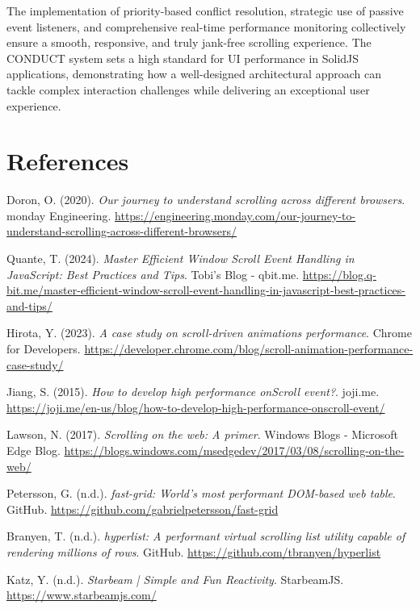 \documentclass[10pt]{article}
\begin{document}
The implementation of priority-based conflict resolution, strategic use of passive event listeners, and comprehensive real-time performance monitoring collectively ensure a smooth, responsive, and truly jank-free scrolling experience. The CONDUCT system sets a high standard for UI performance in SolidJS applications, demonstrating how a well-designed architectural approach can tackle complex interaction challenges while delivering an exceptional user experience.

\section{References}
\begin{thebibliography}{99}

 Doron, O. (2020). \textit{Our journey to understand scrolling across different browsers}. monday Engineering. \url{https://engineering.monday.com/our-journey-to-understand-scrolling-across-different-browsers/}

 Quante, T. (2024). \textit{Master Efficient Window Scroll Event Handling in JavaScript: Best Practices and Tips}. Tobi's Blog - qbit.me. \url{https://blog.q-bit.me/master-efficient-window-scroll-event-handling-in-javascript-best-practices-and-tips/}

 Hirota, Y. (2023). \textit{A case study on scroll-driven animations performance}. Chrome for Developers. \url{https://developer.chrome.com/blog/scroll-animation-performance-case-study/}

 Jiang, S. (2015). \textit{How to develop high performance onScroll event?}. joji.me. \url{https://joji.me/en-us/blog/how-to-develop-high-performance-onscroll-event/}

 Lawson, N. (2017). \textit{Scrolling on the web: A primer}. Windows Blogs - Microsoft Edge Blog. \url{https://blogs.windows.com/msedgedev/2017/03/08/scrolling-on-the-web/}

 Petersson, G. (n.d.). \textit{fast-grid: World's most performant DOM-based web table}. GitHub. \url{https://github.com/gabrielpetersson/fast-grid}

 Branyen, T. (n.d.). \textit{hyperlist: A performant virtual scrolling list utility capable of rendering millions of rows}. GitHub. \url{https://github.com/tbranyen/hyperlist}

 Katz, Y. (n.d.). \textit{Starbeam | Simple and Fun Reactivity}. StarbeamJS. \url{https://www.starbeamjs.com/}


\end{thebibliography}
\end{document}
